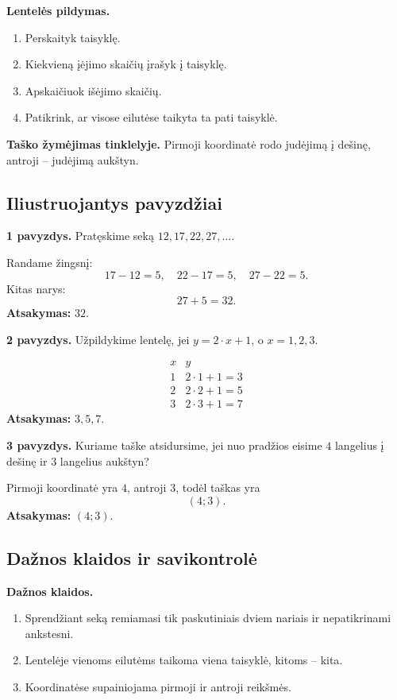 \textbf{Lentelės pildymas.}
\begin{enumerate}[label=\arabic*.]
\item Perskaityk taisyklę.
\item Kiekvieną įėjimo skaičių įrašyk į taisyklę.
\item Apskaičiuok išėjimo skaičių.
\item Patikrink, ar visose eilutėse taikyta ta pati taisyklė.
\end{enumerate}

\textbf{Taško žymėjimas tinklelyje.}
Pirmoji koordinatė rodo judėjimą į dešinę, antroji -- judėjimą aukštyn.

\subsection{Iliustruojantys pavyzdžiai}

\textbf{1 pavyzdys.} Pratęskime seką \(12,17,22,27,\ldots\).

Randame žingsnį:
\[
17-12=5,\quad 22-17=5,\quad 27-22=5.
\]
Kitas narys:
\[
27+5=32.
\]
\textbf{Atsakymas:} \(32\).

\textbf{2 pavyzdys.} Užpildykime lentelę, jei \(y=2\cdot x+1\), o \(x=1,2,3\).

\[
\begin{array}{c|c}
x & y\\ \hline
1 & 2\cdot1+1=3\\
2 & 2\cdot2+1=5\\
3 & 2\cdot3+1=7
\end{array}
\]
\textbf{Atsakymas:} \(3,5,7\).

\textbf{3 pavyzdys.} Kuriame taške atsidursime, jei nuo pradžios eisime \(4\) langelius į dešinę ir \(3\) langelius aukštyn?

Pirmoji koordinatė yra \(4\), antroji \(3\), todėl taškas yra
\[
(4;3).
\]
\textbf{Atsakymas:} \((4;3)\).

\subsection{Dažnos klaidos ir savikontrolė}

\textbf{Dažnos klaidos.}
\begin{enumerate}[label=\arabic*.]
\item Sprendžiant seką remiamasi tik paskutiniais dviem nariais ir nepatikrinami ankstesni.
\item Lentelėje vienoms eilutėms taikoma viena taisyklė, kitoms -- kita.
\item Koordinatėse supainiojama pirmoji ir antroji reikšmės.
\end{enumerate}

